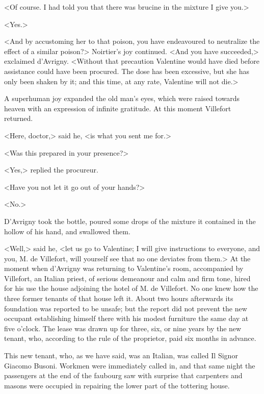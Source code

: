  <Of course. I had told you that there was brucine in the mixture I give you.> 

 <Yes.> 

 <And by accustoming her to that poison, you have endeavoured to neutralize the effect of a similar poison?> Noirtier's joy continued. <And you have succeeded,> exclaimed d'Avrigny. <Without that precaution Valentine would have died before assistance could have been procured. The dose has been excessive, but she has only been shaken by it; and this time, at any rate, Valentine will not die.> 

 A superhuman joy expanded the old man's eyes, which were raised towards heaven with an expression of infinite gratitude. At this moment Villefort returned. 

 <Here, doctor,> said he, <is what you sent me for.> 

 <Was this prepared in your presence?> 

 <Yes,> replied the procureur. 

 <Have you not let it go out of your hands?> 

 <No.> 

 D'Avrigny took the bottle, poured some drops of the mixture it contained in the hollow of his hand, and swallowed them. 

 <Well,> said he, <let us go to Valentine; I will give instructions to everyone, and you, M. de Villefort, will yourself see that no one deviates from them.>  At the moment when d'Avrigny was returning to Valentine's room, accompanied by Villefort, an Italian priest, of serious demeanour and calm and firm tone, hired for his use the house adjoining the hotel of M. de Villefort. No one knew how the three former tenants of that house left it. About two hours afterwards its foundation was reported to be unsafe; but the report did not prevent the new occupant establishing himself there with his modest furniture the same day at five o'clock. The lease was drawn up for three, six, or nine years by the new tenant, who, according to the rule of the proprietor, paid six months in advance. 

 This new tenant, who, as we have said, was an Italian, was called Il Signor Giacomo Busoni. Workmen were immediately called in, and that same night the passengers at the end of the faubourg saw with surprise that carpenters and masons were occupied in repairing the lower part of the tottering house. 